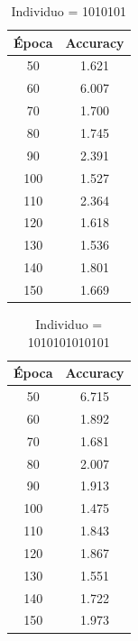\begin{table}[h!]
    \centering
    \begin{tabular}{|c|c|}
        \hline
        \textbf{Época} & \textbf{Accuracy} \\
        \hline
        50 & 1.621 \\
        \hline
        60 & 6.007 \\
        \hline
        70 & 1.700 \\
        \hline
        80 & 1.745 \\
        \hline
        90 & 2.391 \\
        \hline
        100 & 1.527 \\
        \hline
        110 & 2.364 \\
        \hline
        120 & 1.618 \\
        \hline
        130 & 1.536 \\
        \hline
        140 & 1.801 \\
        \hline
        150 & 1.669 \\
        \hline
    \end{tabular}
    \caption{Individuo = 1010101}
    \label{tab:accuracy}
\end{table}


\begin{table}[h!]
    \centering
    \begin{tabular}{|c|c|}
        \hline
        \textbf{Época} & \textbf{Accuracy} \\
        \hline
        50 & 6.715 \\
        \hline
        60 & 1.892 \\
        \hline
        70 & 1.681 \\
        \hline
        80 & 2.007 \\
        \hline
        90 & 1.913 \\
        \hline
        100 & 1.475 \\
        \hline
        110 & 1.843 \\
        \hline
        120 & 1.867 \\
        \hline
        130 & 1.551 \\
        \hline
        140 & 1.722 \\
        \hline
        150 & 1.973 \\
        \hline
    \end{tabular}
    \caption{Individuo = 1010101010101}
    \label{tab:accuracy2}
\end{table}

